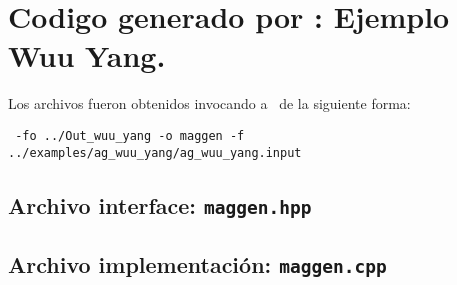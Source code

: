 \section{Codigo generado por \maggen: Ejemplo Wuu Yang.}
\label{append:agwuuyangcode}
Los archivos fueron obtenidos invocando a \maggen\ de la siguiente forma:
\begin{center}
\texttt{\maggen\ -fo ../Out\_wuu\_yang -o maggen -f  ../examples/ag\_wuu\_yang/ag\_wuu\_yang.input}
\end{center}

\subsection*{Archivo interface: \texttt{maggen.hpp}}
\tiny

\subsection*{Archivo implementación: \texttt{maggen.cpp}}
\tiny
